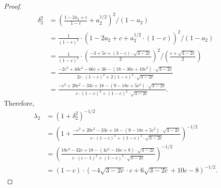 \begin{proof}
\begin{align*}
  \delta_2^2&=\left(\frac{1-2a_2+c}{1-c}+a_2^{1/2}\right)^2/(1-a_2)\\
  &=\frac{1}{(1-c)^2}\cdot\left(1-2a_2+c+a_2^{1/2}\cdot(1-c)\right)^2/(1-a_2) \\
  &=\frac{1}{(1-c)^2}\cdot\left(\frac{-3+5c+(3-c)\cdot\sqrt{3-2c}}{2}\right)^2/\left(\frac{c+\sqrt{3-2c}}{2}\right) \\
  &=\frac{-2c^3+40c^2-66c+36-(18-36c+10c^2)\cdot\sqrt{3-2c}}{2c\cdot(1-c)^2+2(1-c)^2\cdot\sqrt{3-2c}} \\
  &=\frac{-c^3+20c^2-33c+18-(9-18c+5c^2)\cdot\sqrt{3-2c}}{c\cdot(1-c)^2+(1-c)^2\cdot\sqrt{3-2c}}.
\end{align*}
Therefore,
\begin{align*}
  \lambda_2&=(1+\delta_2^2)^{-1/2}\\
  &=\left(1+\frac{-c^3+20c^2-33c+18-(9-18c+5c^2)\cdot\sqrt{3-2c}}{c\cdot(1-c)^2+(1-c)^2\cdot\sqrt{3-2c}}\right)^{-1/2}\\
  &=\left(\frac{18c^2-32c+18-(4c^2-16c+8)\cdot\sqrt{3-2c}}{c\cdot(c-1)^2+(1-c)^2\cdot\sqrt{3-2c}}\right)^{-1/2}\\
  &=(1-c)\cdot\left(-4\sqrt{3-2c}\cdot c+6\sqrt{3-2c}+10c-8\right)^{-1/2}.
\end{align*}
\end{proof}

